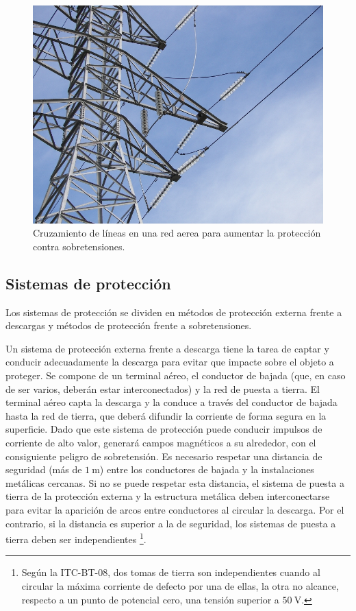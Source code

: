 %
\begin{figure}


\includegraphics[scale=0.4]{../figs/CruzamientoLineaAerea}

\caption{Cruzamiento de líneas en una red aerea para aumentar la protección
contra sobretensiones.\label{fig:CruzamientoLineas}}



\end{figure}



\subsection{Sistemas de protección}

Los sistemas de protección se dividen en métodos de protección externa
frente a descargas y métodos de protección frente a sobretensiones.

Un sistema de protección externa frente a descarga tiene la tarea
de captar y conducir adecuadamente la descarga para evitar que impacte
sobre el objeto a proteger. Se compone de un terminal aéreo, el conductor
de bajada (que, en caso de ser varios, deberán estar interconectados)
y la red de puesta a tierra. El terminal aéreo capta la descarga y
la conduce a través del conductor de bajada hasta la red de tierra,
que deberá difundir la corriente de forma segura en la superficie.
Dado que este sistema de protección puede conducir impulsos de corriente
de alto valor, generará campos magnéticos a su alrededor, con el consiguiente
peligro de sobretensión. Es necesario respetar una distancia de seguridad
(más de $\SI{1}{\meter}$) entre los conductores de bajada y la instalaciones
metálicas cercanas. Si no se puede respetar esta distancia, el sistema
de puesta a tierra de la protección externa y la estructura metálica
deben interconectarse para evitar la aparición de arcos entre conductores
al circular la descarga. Por el contrario, si la distancia es superior
a la de seguridad, los sistemas de puesta a tierra deben ser independientes%
\footnote{Según la ITC-BT-08, dos tomas de tierra son independientes cuando
al circular la máxima corriente de defecto por una de ellas, la otra
no alcance, respecto a un punto de potencial cero, una tensión superior
a $\SI{50}{\volt}$.%
}.

